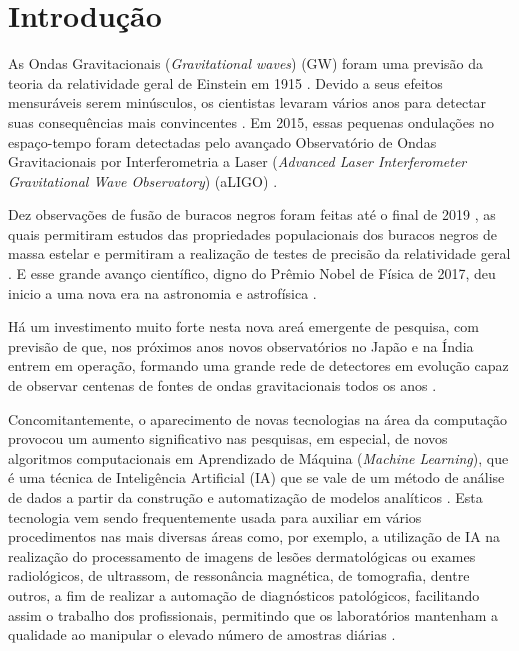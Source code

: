 \chapter{Introdução}
\label{cap:introducao} 

As Ondas Gravitacionais (\textit{Gravitational waves}) (GW) foram uma previsão da teoria da relatividade geral de Einstein em 1915 \cite{albert1920realtivity}. Devido a seus efeitos mensuráveis serem minúsculos, os cientistas levaram vários anos para detectar suas consequências mais convincentes \cite{cervantes2016brief}. Em 2015, essas pequenas ondulações no espaço-tempo foram detectadas pelo avançado Observatório de Ondas Gravitacionais por Interferometria a Laser (\textit{Advanced Laser Interferometer Gravitational Wave Observatory}) (aLIGO) \cite{PhysRevLett.116.131103, 0264-9381-32-7-074001}.

Dez observações de fusão de buracos negros foram feitas até o final de 2019 \cite{Abbott_2019}, as quais permitiram estudos das propriedades populacionais dos buracos negros de massa estelar e permitiram a realização de testes de precisão da relatividade geral \cite{collaboration2018binary}. E esse grande avanço científico, digno do Prêmio Nobel de Física de 2017, deu inicio a uma nova era na astronomia e astrofísica \cite{huerta2017boss}.

Há um investimento muito forte nesta nova areá emergente de pesquisa, com previsão de que, nos próximos anos novos observatórios no Japão e na Índia entrem em operação, formando uma grande rede de detectores em evolução capaz de observar centenas de fontes de ondas gravitacionais todos os anos \cite{PhysRevD.100.063015}.

Concomitantemente, o aparecimento de novas tecnologias na área da computação provocou um aumento significativo nas pesquisas, em especial, de novos algoritmos computacionais em Aprendizado de Máquina (\textit{Machine Learning}), que é uma técnica de Inteligência Artificial (IA) que se vale de um método de análise de dados a partir da construção e automatização de modelos analíticos \cite{bisong2019building}. Esta tecnologia vem sendo frequentemente usada para auxiliar em vários procedimentos nas mais diversas áreas como, por exemplo, a utilização de IA na realização do processamento de imagens de lesões dermatológicas ou exames radiológicos, de ultrassom, de ressonância magnética, de tomografia, dentre outros, a fim de realizar a automação de diagnósticos patológicos, facilitando assim o trabalho dos profissionais, permitindo que os laboratórios mantenham a qualidade ao manipular o elevado número de amostras diárias \cite{lobo2017inteligencia}.

